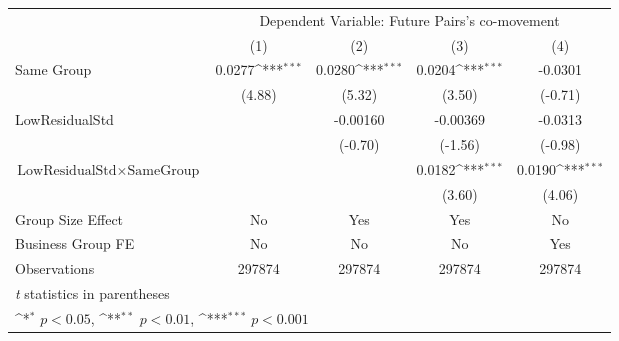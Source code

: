 {
\def\sym#1{\ifmmode^{#1}\else\(^{#1}\)\fi}
\begin{tabular}{l*{4}{c}}
\hline\hline
                &\multicolumn{4}{c}{Dependent Variable:  Future Pairs's co-movement}        \\\cmidrule(lr){2-5}
                &\multicolumn{1}{c}{(1)}         &\multicolumn{1}{c}{(2)}         &\multicolumn{1}{c}{(3)}         &\multicolumn{1}{c}{(4)}         \\
\hline
Same Group      &   0.0277\sym{***}&   0.0280\sym{***}&   0.0204\sym{***}&  -0.0301         \\
                &   (4.88)         &   (5.32)         &   (3.50)         &  (-0.71)         \\
[1em]
LowResidualStd  &                  & -0.00160         & -0.00369         &  -0.0313         \\
                &                  &  (-0.70)         &  (-1.56)         &  (-0.98)         \\
[1em]
$ {\text{LowResidualStd} } \times {\text{SameGroup} }  $ &                  &                  &   0.0182\sym{***}&   0.0190\sym{***}\\
                &                  &                  &   (3.60)         &   (4.06)         \\
\hline
Group Size Effect&       No         &      Yes         &      Yes         &       No         \\
Business Group FE&       No         &       No         &       No         &      Yes         \\
Observations    &   297874         &   297874         &   297874         &   297874         \\
\hline\hline
\multicolumn{5}{l}{\footnotesize \textit{t} statistics in parentheses}\\
\multicolumn{5}{l}{\footnotesize \sym{*} \(p<0.05\), \sym{**} \(p<0.01\), \sym{***} \(p<0.001\)}\\
\end{tabular}
}
